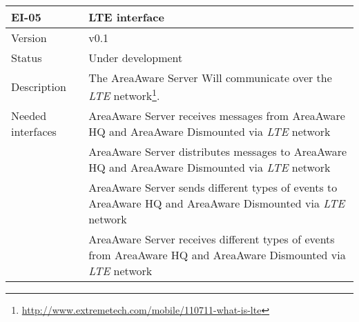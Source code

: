 \begin{longtable}{| p{3.5cm} |  p{10cm} | }
	\hline
	\textbf{EI-05} &  \textbf{LTE interface} \\
	\hline
	Version & v0.1 \\
	\hline
	Status & Under development \\
	\hline
	Description & The AreaAware Server Will communicate over the \emph{LTE} network\footnote{\url{http://www.extremetech.com/mobile/110711-what-is-lte}}.
	\\
	\hline
	Needed interfaces 
	& AreaAware Server receives messages from AreaAware HQ and AreaAware Dismounted via \emph{LTE} network \\
	& AreaAware Server distributes messages to AreaAware HQ and AreaAware Dismounted via \emph{LTE} network \\ 
	& AreaAware Server sends different types of events to AreaAware HQ and AreaAware Dismounted via \emph{LTE} network \\
	& AreaAware Server receives different types of events from AreaAware HQ and AreaAware Dismounted via \emph{LTE} network \\
	\hline
\end{longtable}
